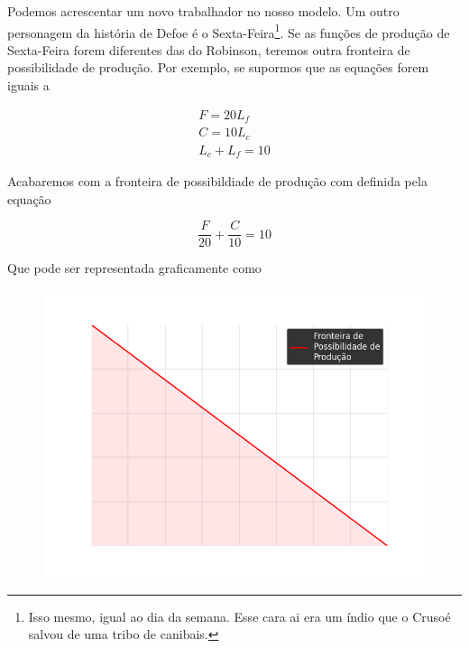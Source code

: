 \documentclass[a4paper,11pt,oneside]{book}
\theoremstyle{definition}
\theoremstyle{break}
\begin{document}
Podemos acrescentar um novo trabalhador no nosso modelo. Um outro personagem da história de Defoe é o Sexta-Feira\footnote{Isso mesmo, igual ao dia da semana. Esse cara ai era um índio que o Crusoé salvou de uma tribo de canibais.}. Se as funções de produção de Sexta-Feira forem diferentes das do Robinson, teremos outra fronteira de possibilidade de produção. Por exemplo, se supormos que as equações forem iguais a 

\begin{equation*}
	\begin{split}
		F = 20L_f \\
		C = 10L_c	\\
		L_c + L_f = 10
	\end{split}
\end{equation*}

Acabaremos com a fronteira de possibildiade de produção com definida pela equação

$$\frac{F}{20} + \frac{C}{10} = 10$$

Que pode ser representada graficamente como

\begin{figure}[H]
	\centering
	\includegraphics[scale=0.6]{cap33_10-pos_prod1.png}
\end{figure}
\end{document}
